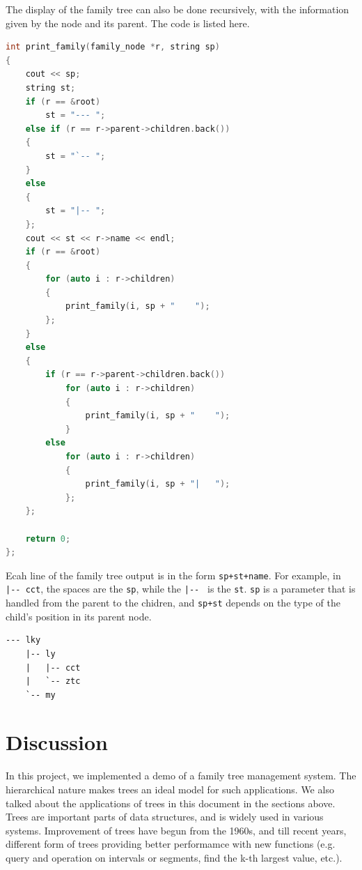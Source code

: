 \documentclass[cn,black,12pt,normal]{elegantnote}
\begin{document}
The display of the family tree can also be done recursively, with the information given by the node and its parent. The code is listed here.
\begin{lstlisting}[language = C++]
int print_family(family_node *r, string sp)
{
	cout << sp;
	string st;
	if (r == &root)
		st = "--- ";
	else if (r == r->parent->children.back())
	{
		st = "`-- ";
	}
	else
	{
		st = "|-- ";
	};
	cout << st << r->name << endl;
	if (r == &root)
	{
		for (auto i : r->children)
		{
			print_family(i, sp + "    ");
		};
	}
	else
	{
		if (r == r->parent->children.back())
			for (auto i : r->children)
			{
				print_family(i, sp + "    ");
			}
		else
			for (auto i : r->children)
			{
				print_family(i, sp + "|   ");
			};
	};

	return 0;
};
\end{lstlisting}
Ecah line of the family tree output is in the form \lstinline{sp+st+name}. For example, in \lstinline{        |-- cct}, the spaces are the \lstinline{sp}, while the \lstinline{|-- } is the \lstinline{st}. \lstinline{sp} is a parameter that is handled from the parent to the chidren, and \lstinline{sp+st} depends on the type of the child's position in its parent node.
\begin{lstlisting}
--- lky
    |-- ly
    |   |-- cct
    |   `-- ztc
    `-- my
\end{lstlisting}

\section{Discussion}

In this project, we implemented a demo of a family tree management system. The hierarchical nature makes trees an ideal model for such applications. We also talked about the applications of trees in this document in the sections above. Trees are important parts of data structures, and is widely used in various systems. Improvement of trees have begun from the 1960s, and till recent years, different form of trees providing better performamce with new functions (e.g. query and operation on intervals or segments, find the k-th largest value, etc.).

\newpage

\end{document}
